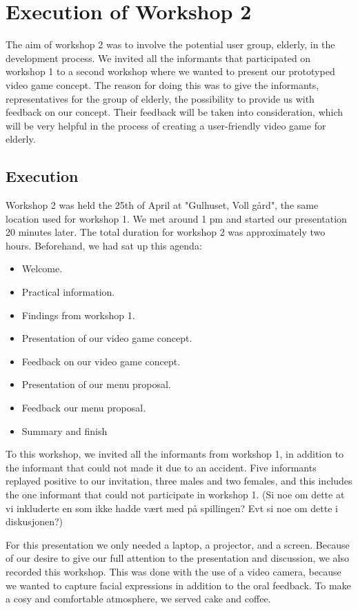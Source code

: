 \chapter{Execution of Workshop 2}
The aim of workshop 2 was to involve the potential user group, elderly, in the development process. We invited all the informants that participated on workshop 1 to a second workshop where we wanted to present our prototyped video game concept. The reason for doing this was to give the informants, representatives for the group of elderly, the possibility to provide us with feedback on our concept. Their feedback will be taken into consideration, which will be very helpful in the process of creating a user-friendly video game for elderly.  

\section{Execution}
Workshop 2 was held the 25th of April at "Gulhuset, Voll gård", the same location used for workshop 1. We met around 1 pm and started our presentation 20 minutes later. The total duration for workshop 2 was approximately two hours. Beforehand, we had sat up this agenda:

\begin{itemize}
\renewcommand{\labelitemi}{$\bullet$}
\item Welcome.
\item Practical information.
\item Findings from workshop 1.
\item Presentation of our video game concept.
\item Feedback on our video game concept.
\item Presentation of our menu proposal.
\item Feedback our menu proposal.
\item Summary and finish
\end{itemize}

To this workshop, we invited all the informants from workshop 1, in addition to the informant that could not made it due to an accident. Five informants replayed positive to our invitation, three males and two females, and this includes the one informant that could not participate in workshop 1. (Si noe om dette at vi inkluderte en som ikke hadde vært med på spillingen? Evt si noe om dette i diskusjonen?)

For this presentation we only needed a laptop, a projector, and a screen. Because of our desire to give our full attention to the presentation and discussion, we also recorded this workshop. This was done with the use of a video camera, because we wanted to capture facial expressions in addition to the oral feedback. To make a cosy and comfortable atmosphere, we served cake and coffee.   

